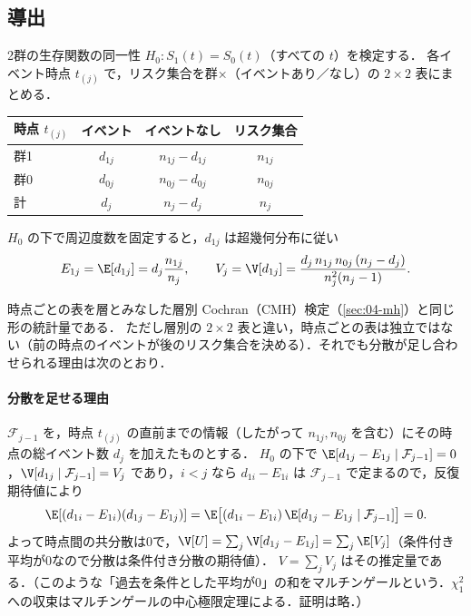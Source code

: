 \subsection{導出}
2群の生存関数の同一性 $H_0:S_1(t)=S_0(t)$（すべての $t$）を検定する．
各イベント時点 $t_{(j)}$ で，リスク集合を群×（イベントあり／なし）の $2\times2$ 表にまとめる．
\begin{center}\small
\begin{tabular}{@{}lccc@{}}
\toprule
時点 $t_{(j)}$ & イベント & イベントなし & リスク集合\\
\midrule
群1 & $d_{1j}$ & $n_{1j}-d_{1j}$ & $n_{1j}$\\
群0 & $d_{0j}$ & $n_{0j}-d_{0j}$ & $n_{0j}$\\
\midrule
計 & $d_j$ & $n_j-d_j$ & $n_j$\\
\bottomrule
\end{tabular}
\end{center}
$H_0$ の下で周辺度数を固定すると，$d_{1j}$ は超幾何分布に従い
\begin{equation}
E_{1j}=\E[d_{1j}]=d_j\frac{n_{1j}}{n_j},\qquad V_j=\V[d_{1j}]=\frac{d_j\,n_{1j}\,n_{0j}\,(n_j-d_j)}{n_j^2(n_j-1)}.\label{eq:09-lrmoments}
\end{equation}
時点ごとの表を層とみなした層別 Cochran（CMH）検定（\cref{sec:04-mh}）と同じ形の統計量である．
ただし層別の $2\times2$ 表と違い，時点ごとの表は独立ではない（前の時点のイベントが後のリスク集合を決める）．それでも分散が足し合わせられる理由は次のとおり．
\paragraph{分散を足せる理由}
$\mathcal F_{j-1}$ を，時点 $t_{(j)}$ の直前までの情報（したがって $n_{1j},n_{0j}$ を含む）にその時点の総イベント数 $d_j$ を加えたものとする．
$H_0$ の下で $\E[d_{1j}-E_{1j}\mid\mathcal F_{j-1}]=0$，$\V[d_{1j}\mid\mathcal F_{j-1}]=V_j$ であり，$i<j$ なら $d_{1i}-E_{1i}$ は $\mathcal F_{j-1}$ で定まるので，反復期待値により
\[
\E[(d_{1i}-E_{1i})(d_{1j}-E_{1j})]=\E\bigl[(d_{1i}-E_{1i})\,\E[d_{1j}-E_{1j}\mid\mathcal F_{j-1}]\bigr]=0 .
\]
よって時点間の共分散は0で，$\V[U]=\sum_j\V[d_{1j}-E_{1j}]=\sum_j\E[V_j]$（条件付き平均が0なので分散は条件付き分散の期待値）．
$V=\sum_jV_j$ はその推定量である．（このような「過去を条件とした平均が0」の和をマルチンゲールという．$\chi^2_1$ への収束はマルチンゲールの中心極限定理による．証明は略．）

